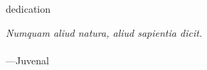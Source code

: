 \begin{frontmatter}
\makefrontmatter                                                               


\begin{dedication}                                                             
dedication
\end{dedication}                                                               
\clearpage 


\begin{myepigraph} %
  \vfil                                                                        
  \vfil 
  \hfill {\it Numquam aliud natura, aliud sapientia dicit.} \\
  \vfil 
   \hfill \\
  \vfil 
  \hfill ---Juvenal
  \vfil 
\end{myepigraph}                                                               

\tableofcontents
\listoffigures  %
\listoftables   %


\end{frontmatter}
